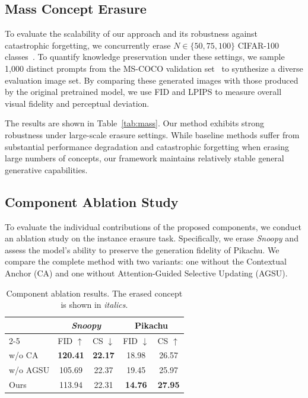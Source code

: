 \documentclass[letterpaper]{article} %
\newcommand{\erased}[1]{\textit{#1}}
\begin{document}
\subsection{Mass Concept Erasure}
To evaluate the scalability of our approach and its robustness against catastrophic forgetting, we concurrently erase $N \in \{50,75,100\}$ CIFAR-100 classes~\cite{CIFAR}. To quantify knowledge preservation under these settings, we sample 1,000 distinct prompts from the MS-COCO validation set~\cite{coco} to synthesize a diverse evaluation image set. By comparing these generated images with those produced by the original pretrained model, we use FID and LPIPS to measure overall visual fidelity and perceptual deviation.

The results are shown in Table~\ref{tab:mass}. Our method exhibits strong robustness under large-scale erasure settings. While baseline methods suffer from substantial performance degradation and catastrophic forgetting when erasing large numbers of concepts, our framework maintains relatively stable general generative capabilities.

\subsection{Component Ablation Study}

To evaluate the individual contributions of the proposed components, we conduct an ablation study on the instance erasure task. Specifically, we erase \textit{Snoopy} and assess the model's ability to preserve the generation fidelity of Pikachu. We compare the complete method with two variants: one without the Contextual Anchor (CA) and one without Attention-Guided Selective Updating (AGSU). 

\begin{table}[t]
\centering
\small
\setlength{\tabcolsep}{3.5pt}
\begin{tabular}{|l|cc|cc|}
\hline
\multirow{2}{*}{} & \multicolumn{2}{c|}{\erased{Snoopy}} & \multicolumn{2}{c|}{Pikachu} \\ \cline{2-5}
                  & FID $\uparrow$ & CS $\downarrow$ & FID $\downarrow$ & CS $\uparrow$ \\ \hline
w/o CA   & \textbf{120.41} & \textbf{22.17} & 18.98 & 26.57 \\
w/o AGSU & 105.69 & 22.37 & 19.45 & 25.97 \\
Ours     & 113.94 & 22.31 & \textbf{14.76} & \textbf{27.95} \\ \hline
\end{tabular}
\caption{Component ablation results. The erased concept is shown in \textit{italics}.}
\label{tab:ablation}
\end{table}
\end{document}
